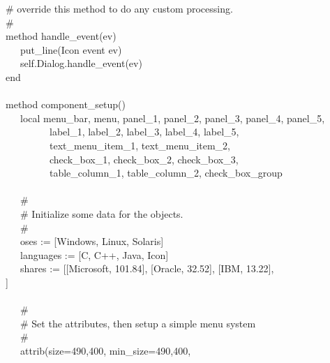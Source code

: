 {\>   \# override this method to do any custom processing. \\
\>   \# \\
\>   method handle\_event(ev) \\
\>   \ \ \ put\_line({\textquotedbl}Icon event {\textquotedbl}
{\textbar}{\textbar} ev) \\
\>   \ \ \ self.Dialog.handle\_event(ev) \\
\>   end \\
\ \\
\>   method component\_setup() \\
\>   \ \ \ local menu\_bar, menu, panel\_1, panel\_2, panel\_3, panel\_4, panel\_5, \\
\>   \ \ \ \ \ \ \ \ \ label\_1, label\_2, label\_3, label\_4, label\_5, \\
\>   \ \ \ \ \ \ \ \ \ text\_menu\_item\_1, text\_menu\_item\_2, \\
\>   \ \ \ \ \ \ \ \ \ check\_box\_1, check\_box\_2, check\_box\_3, \\
\>   \ \ \ \ \ \ \ \ \ table\_column\_1, table\_column\_2, check\_box\_group \\
\ \\
\>   \ \ \ \# \\
\>   \ \ \ \# Initialize some data for the objects. \\
\>   \ \ \ \# \\
\>   \ \ \ oses := [{\textquotedbl}Windows{\textquotedbl},
{\textquotedbl}Linux{\textquotedbl},
{\textquotedbl}Solaris{\textquotedbl}] \\
\>   \ \ \ languages := [{\textquotedbl}C{\textquotedbl},
{\textquotedbl}C++{\textquotedbl}, {\textquotedbl}Java{\textquotedbl},
{\textquotedbl}Icon{\textquotedbl}] \\
\>   \ \ \ shares := [[{\textquotedbl}Microsoft{\textquotedbl},
{\textquotedbl}101.84{\textquotedbl}],
[{\textquotedbl}Oracle{\textquotedbl},
{\textquotedbl}32.52{\textquotedbl}],
[{\textquotedbl}IBM{\textquotedbl},
{\textquotedbl}13.22{\textquotedbl}], \\
\>\>] \\
\ \\
\>   \ \ \ \# \\
\>   \ \ \ \# Set the attributes, then setup a simple menu system \\
\>   \ \ \ \# \\
\>   \ \ \ attrib({\textquotedbl}size=490,400{\textquotedbl},
{\textquotedbl}min\_size=490,400{\textquotedbl},
}
